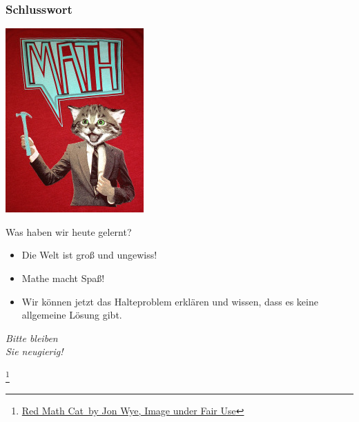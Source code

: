 \documentclass[aspectratio=43]{beamer}
\newcommand\blfootnote[1]{%
  \begingroup
  \renewcommand\thefootnote{}\footnote{#1}%
  \addtocounter{footnote}{-1}%
  \endgroup
}
\begin{document}
\begin{frame}
\frametitle{Schlusswort}

\begin{multicols}{2}

\includegraphics[scale=0.7]{images/red_math_cat.jpg} 

\columnbreak

Was haben wir heute gelernt?

\begin{itemize}
\pause\item Die Welt ist groß und ungewiss!
\pause\item Mathe macht Spaß!
\pause\item Wir können jetzt das Halteproblem erklären und wissen, dass es keine allgemeine Lösung gibt.
\end{itemize}
\pause\bigskip

\begin{center}
\Large \emph{Bitte bleiben\\ Sie neugierig!}

\end{center}
\end{multicols}

\blfootnote{\href{https://jonwye.com/t-shirts/math-cat-t-shirt-men.html}{\glqq Red Math Cat\grqq\ by Jon Wye, Image under Fair Use}}
\end{frame}
\end{document}
